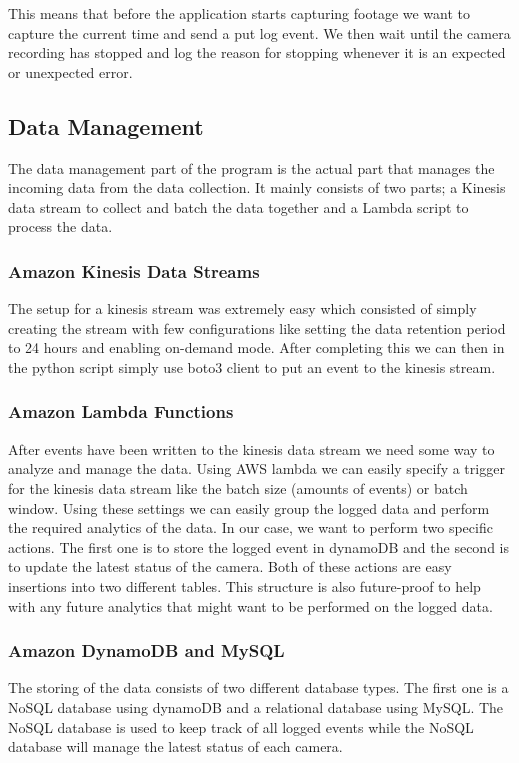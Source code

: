\documentclass[12pt]{article}
\begin{document}
This means that before the application starts capturing footage we want to capture the current time and send a put log event. We then wait until the camera recording has stopped and log the reason for stopping whenever it is an expected or unexpected error.

\subsection{Data Management}
The data management part of the program is the actual part that manages the incoming data from the data collection. It mainly consists of two parts; a Kinesis data stream to collect and batch the data together and a Lambda script to process the data.

\subsubsection{Amazon Kinesis Data Streams}
The setup for a kinesis stream was extremely easy which consisted of simply creating the stream with few configurations like setting the data retention period to 24 hours and enabling on-demand mode. After completing this we can then in the python script simply use boto3 \cite{Boto312825:online} client to put an event to the kinesis stream.

\subsubsection{Amazon Lambda Functions}
After events have been written to the kinesis data stream we need some way to analyze and manage the data. Using AWS lambda we can easily specify a trigger for the kinesis data stream like the batch size (amounts of events) or batch window. Using these settings we can easily group the logged data and perform the required analytics of the data. In our case, we want to perform two specific actions. The first one is to store the logged event in dynamoDB and the second is to update the latest status of the camera. Both of these actions are easy insertions into two different tables. This structure is also future-proof to help with any future analytics that might want to be performed on the logged data.

\subsubsection{Amazon DynamoDB and MySQL}
The storing of the data consists of two different database types. The first one is a NoSQL database using dynamoDB and a relational database using MySQL. The NoSQL database is used to keep track of all logged events while the NoSQL database will manage the latest status of each camera.
\end{document}
